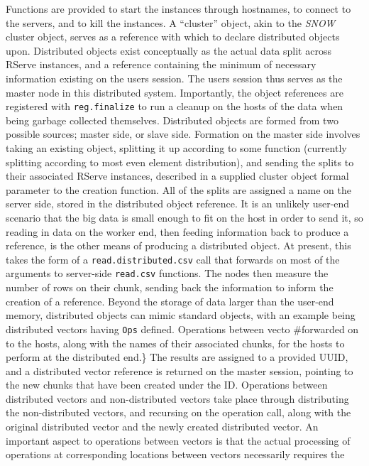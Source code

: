 Functions are provided to start the instances through hostnames, to
connect to the servers, and to kill the instances. A ``cluster'' object,
akin to the \emph{SNOW} cluster object, serves as a reference with which
to declare distributed objects upon. Distributed objects exist
conceptually as the actual data split across RServe instances, and a
reference containing the minimum of necessary information existing on
the users \R session. The users \R session thus serves as the master node
in this distributed system. Importantly, the object references are
registered with \texttt{reg.finalize} to run a cleanup on the hosts of
the data when being garbage collected themselves. Distributed objects
are formed from two possible sources; master side, or slave side.
Formation on the master side involves taking an existing \R object,
splitting it up according to some function (currently splitting
according to most even element distribution), and sending the splits to
their associated RServe instances, described in a supplied cluster
object formal parameter to the creation function. All of the splits are
assigned a name on the server side, stored in the distributed object
reference. It is an unlikely user-end scenario that the big data is
small enough to fit on the host in order to send it, so reading in data
on the worker end, then feeding information back to produce a reference,
is the other means of producing a distributed object. At present, this
takes the form of a \texttt{read.distributed.csv} call that forwards on
most of the arguments to server-side \texttt{read.csv} functions. The
nodes then measure the number of rows on their chunk, sending back the
information to inform the creation of a reference. Beyond the storage of
data larger than the user-end memory, distributed objects can mimic
standard \R objects, with an example being distributed vectors having
\texttt{Ops} defined. Operations between vecto \#forwarded on to the
hosts, along with the names of their associated chunks, for the hosts to
perform at the distributed end.\} The results are assigned to a provided
UUID, and a distributed vector reference is returned on the master
session, pointing to the new chunks that have been created under the ID.
Operations between distributed vectors and non-distributed vectors take
place through distributing the non-distributed vectors, and recursing on
the operation call, along with the original distributed vector and the
newly created distributed vector. An important aspect to operations
between vectors is that the actual processing of operations at
corresponding locations between vectors necessarily requires the
